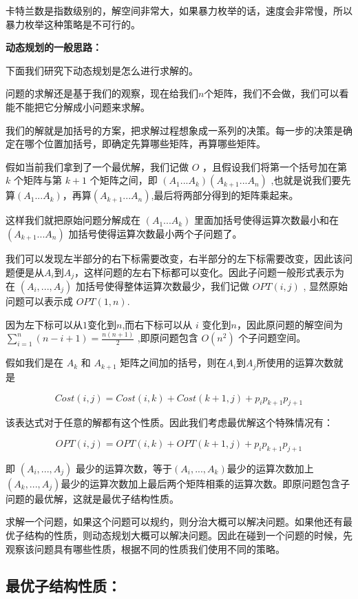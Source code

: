 卡特兰数是指数级别的，解空间非常大，如果暴力枚举的话，速度会非常慢，所以暴力枚举这种策略是不可行的。

\textbf{动态规划的一般思路：}

下面我们研究下动态规划是怎么进行求解的。

问题的求解还是基于我们的观察，现在给我们$n$个矩阵，我们不会做，我们可以看能不能把它分解成小问题来求解。

我们的解就是加括号的方案，把求解过程想象成一系列的决策。每一步的决策是确定在哪个位置加括号，即确定先算哪些矩阵，再算哪些矩阵。

假如当前我们拿到了一个最优解，我们记做 $O$ ，且假设我们将第一个括号加在第 $k$ 个矩阵与第 $k+1$ 个矩阵之间，即 ${(A_1 ... A_k)(A_{k+1}...A_{n})}$ ,也就是说我们要先算$(A_1 ... A_k)$，再算$(A_{k+1}...A_{n})$,最后将两部分得到的矩阵乘起来。

这样我们就把原始问题分解成在 $(A_1 ... A_k)$ 里面加括号使得运算次数最小和在 $(A_{k+1}...A_{n})$ 加括号使得运算次数最小两个子问题了。

我们可以发现左半部分的右下标需要改变，右半部分的左下标需要改变，因此该问题便是从$A_i$到$A_j$，这样问题的左右下标都可以变化。因此子问题一般形式表示为在 $(A_i,...,A_j)$ 加括号使得整体运算次数最少，我们记做 $OPT(i,j)$ , 显然原始问题可以表示成 $OPT(1,n)$.

因为左下标可以从$1$变化到$n$,而右下标可以从 $i$ 变化到$n$，因此原问题的解空间为$\sum_{i = 1}^n(n - i + 1) = \frac{n(n+1)}{2}$ ,即原问题包含 $O(n^2)$ 个子问题空间。

假如我们是在 $A_k$ 和 $A_{k+1}$ 矩阵之间加的括号，则在$A_i$到$A_j$所使用的运算次数就是

 \[Cost(i, j) = Cost(i, k) + Cost(k+1, j) + p_ip_{k+1}p_{j+1}\]

该表达式对于任意的解都有这个性质。因此我们考虑最优解这个特殊情况有：

\[OPT(i, j) = OPT(i, k) + OPT(k+1, j) + p_ip_{k+1}p_{j+1}\]

即 $(A_i,...,A_j)$ 最少的运算次数，等于$(A_i,...,A_k)$最少的运算次数加上$(A_k,...,A_j)$最少的运算次数加上最后两个矩阵相乘的运算次数。即原问题包含子问题的最优解，这就是最优子结构性质。

求解一个问题，如果这个问题可以规约，则分治大概可以解决问题。如果他还有最优子结构的性质，则动态规划大概可以解决问题。因此在碰到一个问题的时候，先观察该问题具有哪些性质，根据不同的性质我们使用不同的策略。

\subsection{最优子结构性质：}

